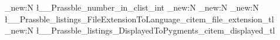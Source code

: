 \ExplSyntaxOn
    \int_new:N \l__Prassble_number_in_clist_int
      \tl_new:N \displayedname
      \tl_new:N \pygmentsname
      \tl_new:N \l__Prassble_listings_FileExtensionToLanguage_citem_file_extension_tl
      \tl_new:N \l__Prassble_listings_DisplayedToPygments_citem_displayed_tl
